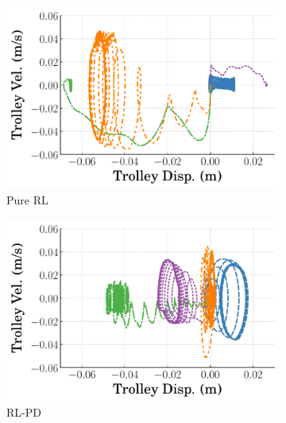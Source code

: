 \begin{figure}[tb]
  \centering
  \begin{subfigure}[b]{0.49\textwidth}
      \centering
      \includegraphics[width=\textwidth]{figures/figures_stability/time_responses_crane/dpcrane_pure_RL/dpcrane_pure_RL_trolley_phase_plots.pdf}
      \caption{Pure RL}
      \label{subfig_chap3:dpcrane_pure_RL_phase_trolley}
  \end{subfigure}
  \hfill
  \begin{subfigure}[b]{0.49\textwidth}
    \centering
    \includegraphics[width=\textwidth]{figures/figures_stability/time_responses_crane/dpcrane_cont_gain_sched/dpcrane_cont_gain_sched_trolley_phase_plots.pdf}
    \caption{RL-PD}
    \label{subfig_chap3:dpcrane_RL_PD_phase_trolley}
  \end{subfigure}
  \hfill
  \begin{subfigure}[b]{0.49\textwidth}

\end{subfigure}
\end{figure}
